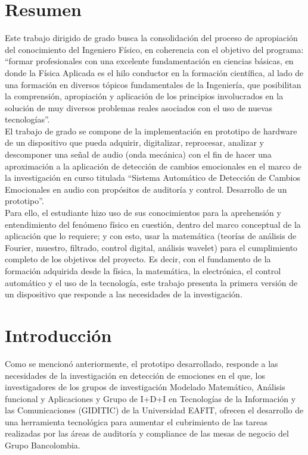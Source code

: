 \documentclass[11pt,lettersize]{article} %
\begin{document}
\cleardoublepage {}
{}
\section*{Resumen}
Este trabajo dirigido de grado busca la consolidación del proceso de apropiación del conocimiento del Ingeniero Físico, en coherencia con el objetivo del programa: ``formar profesionales con una excelente fundamentación en ciencias básicas, en donde la Física Aplicada es el hilo conductor en la formación científica, al lado de una formación en diversos tópicos fundamentales de la Ingeniería, que posibilitan la comprensión, apropiación y aplicación de los principios involucrados en la solución de muy diversos problemas reales asociados con el uso de nuevas tecnologías''.\\

El trabajo de grado se compone de la implementación en prototipo de hardware de un dispositivo que pueda adquirir, digitalizar, reprocesar, analizar y descomponer una señal de audio (onda mecánica) con el fin de hacer una aproximación a la aplicación de detección de cambios emocionales en el marco de la investigación en curso titulada “Sistema Automático de Detección de Cambios Emocionales en audio con propósitos de auditoría y control. Desarrollo de un prototipo”.\\

Para ello, el estudiante hizo uso de sus conocimientos para la aprehensión y entendimiento del fenómeno físico en cuestión, dentro del marco conceptual de la aplicación que lo requiere; y con esto, usar la matemática (teorías de análisis de Fourier, muestro, filtrado, control digital, análisis wavelet) para el cumplimiento completo de los objetivos del proyecto. Es decir, con el fundamento de la formación adquirida desde la física, la matemática, la electrónica, el control automático y el uso de la tecnología, este trabajo presenta la primera versión de un dispositivo que responde a las necesidades de la investigación.

\cleardoublepage
{}
\section*{Introducción}
Como se mencionó anteriormente, el prototipo desarrollado, responde a las necesidades de la investigación en detección de emociones en el que, los investigadores de los grupos de investigación Modelado Matemático, Análisis funcional y Aplicaciones y Grupo de I+D+I en Tecnologías de la Información y las Comunicaciones (GIDITIC) de la Universidad EAFIT, ofrecen el desarrollo de una herramienta tecnológica para aumentar el cubrimiento de las tareas realizadas por las áreas de auditoría y compliance de las mesas de negocio del Grupo Bancolombia.\\
\end{document}

